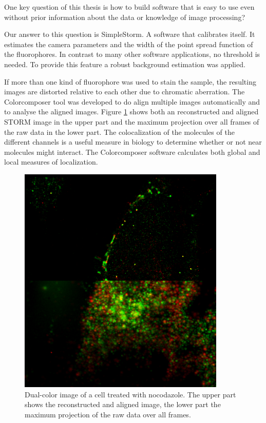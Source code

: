 One key question of this thesis is how to build software that is easy to use even without prior information about the data or knowledge of image processing? \newline

Our answer to this question is SimpleStorm. A software that calibrates itself. It estimates the camera parameters and the width of the point spread function of the fluorophores. In contrast to many other software applications, no threshold is needed. To provide this feature a robust background estimation was applied.\newline

If more than one kind of fluorophore was used to stain the sample, the resulting images are distorted relative to each other due to chromatic aberration. The Colorcomposer tool was developed to do align multiple images automatically and to analyse the aligned images. Figure \ref{dualcolor} shows both an reconstructed and aligned STORM image in the upper part and the maximum projection over all frames of the raw data in the lower part. The colocalization of the molecules of the different channels is a useful measure in biology to determine whether or not near molecules might interact. The Colorcomposer software calculates both global and local measures of localization.

\begin{figure}
\centering
\includegraphics[width = 0.88\textwidth]{pictures/alignedStormWidefield.png}
	\caption{Dual-color image of a cell treated with nocodazole. The upper part shows the reconstructed and aligned image, the lower part the maximum projection of the raw data over all frames.}
	\label{dualcolor}
\end{figure}


